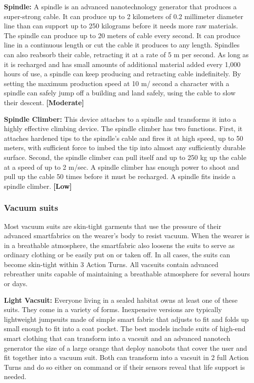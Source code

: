 \textbf{Spindle:} A spindle is an advanced nanotechnology generator that produces a super-strong cable. It can produce up to 2 kilometers of 0.2 millimeter diameter line than can support up to 250 kilograms before it needs more raw materials. The spindle can produce up to 20 meters of cable every second. It can produce line in a continuous length or cut the cable it produces to any length. Spindles can also reabsorb their cable, retracting it at a rate of 5 m per second. As long as it is recharged and has small amounts of additional material added every 1,000 hours of use, a spindle can keep producing and retracting cable indefinitely. By setting the maximum production speed at 10 m/ second a character with a spindle can safely jump off a building and land safely, using the cable to slow their descent. \textbf{[Moderate]} 

\textbf{Spindle Climber:} This device attaches to a spindle and transforms it into a highly effective climbing device. The spindle climber has two functions. First, it attaches hardened tips to the spindle’s cable and fires it at high speed, up to 50 meters, with sufficient force to imbed the tip into almost any sufficiently durable surface. Second, the spindle climber can pull itself and up to 250 kg up the cable at a speed of up to 2 m/sec. A spindle climber has enough power to shoot and pull up the cable 50 times before it must be recharged. A spindle fits inside a spindle climber. \textbf{[Low]} 

\subsubsection{Vacuum suits} 

Most vacuum suits are skin-tight garments that use the pressure of their advanced smartfabrics on the wearer’s body to resist vacuum. When the wearer is in a breathable atmosphere, the smartfabric also loosens the suits to serve as ordinary clothing or be easily put on or taken off. In all cases, the suits can become skin-tight within 3 Action Turns. All vacsuits contain advanced rebreather units capable of maintaining a breathable atmosphere for several hours or days. 

\textbf{Light Vacsuit:} Everyone living in a sealed habitat owns at least one of these suits. They come in a variety of forms. Inexpensive versions are typically lightweight jumpsuits made of simple smart fabric that adjusts to fit and folds up small enough to fit into a coat pocket. The best models include suits of high-end smart clothing that can transform into a vacsuit and an advanced nanotech generator the size of a large orange that deploy nanobots that cover the user and fit together into a vacuum suit. Both can transform into a vacsuit in 2 full Action Turns and do so either on command or if their sensors reveal that life support is needed. 

